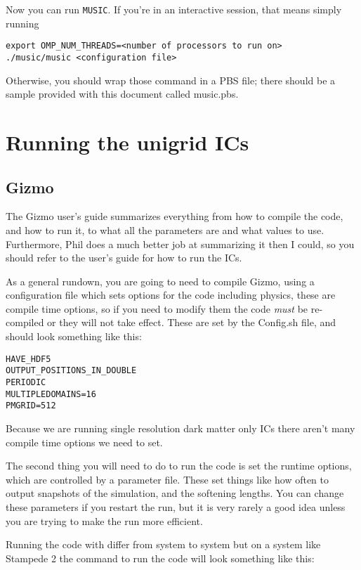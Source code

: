 \documentclass[10pt,a4paper,onecolumn]{article}
\begin{document}
Now you can run \texttt{MUSIC}.  If you're in an interactive session, that means simply running
\begin{verbatim}
export OMP_NUM_THREADS=<number of processors to run on>
./music/music <configuration file>
\end{verbatim}
Otherwise, you should wrap those command in a PBS file; there should 
be a sample provided with this document called music.pbs.

\section{Running the unigrid ICs}

\subsection{Gizmo}

The Gizmo user's guide summarizes everything from how to compile the code, and how to run it, to what all the parameters are and what values to use. Furthermore, Phil does a much better job at summarizing it then I could, so you should refer to the user's guide for how to run the ICs.

As a general rundown, you are going to need to compile Gizmo, using a configuration file which sets options for the code including physics, these are compile time options, so if you need to modify them the code \emph{must} be re-compiled or they will not take effect. These are set by the Config.sh file, and should look something like this:

\begin{verbatim}
HAVE_HDF5
OUTPUT_POSITIONS_IN_DOUBLE
PERIODIC
MULTIPLEDOMAINS=16
PMGRID=512
\end{verbatim}

Because we are running single resolution dark matter only ICs there aren't many compile time options we need to set.

The second thing you will need to do to run the code is set the runtime options, which are controlled by a parameter file. These set things like how often to output snapshots of the simulation, and the softening lengths. You can change these parameters if you restart the run, but it is very rarely a good idea unless you are trying to make the run more efficient.

Running the code with differ from system to system but on a system like Stampede 2 the command to run the code will look something like this:
\end{document}
